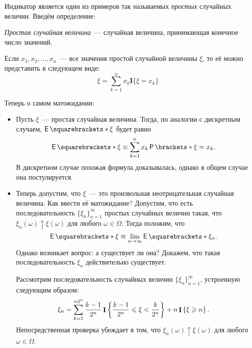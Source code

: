 Индикатор является один из примеров так называемых \emph{простых} случайных величин. Введём определение:

\begin{definition}
    \emph{Простая случайная величина}~--- случайная величина, принимающая конечное число значений.
\end{definition}

Если \(x_1, x_2, \dots, x_n\)~--- все значения простой случайной величины \(\xi\), то её можно представить в следующем виде:
\[
\xi = \sum_{k = 1}^{n} x_k\mathbf{I}\{\xi = x_k\}
\]

Теперь о самом матожидании:

\begin{itemize}
	\item Пусть \(\xi\)~--- простая случайная величина. Тогда, по аналогии с дискретным случаем, \(\E{\xi}\) будет равно
	\[
	\E{\xi} \equiv \sum_{k = 1}^{n} x_k\Pr{\xi = x_k}.
	\]
	В дискретном случае похожая формула доказывалась, однако в общем случае она постулируется.
	
	\item Теперь допустим, что \(\xi\)~--- это произвольная неотрицательная случайная величина. Как ввести её матожидание? Допустим, что есть последовательность \(\{\xi_n\}_{n = 1}^{\infty}\) простых случайных величин такая, что \(\xi_n(\omega) \uparrow \xi(\omega)\) для любого \(\omega \in \Omega\). Тогда положим, что
	\[
	\E{\xi} \equiv \lim\limits_{n \to \infty} \E{\xi_n}.
	\]
	Однако возникает вопрос: а существует ли она? Докажем, что такая последовательность \(\xi_n\) действительно существует.
	
	Рассмотрим последовательность случайных величин \(\{\xi_n\}_{n = 1}^{\infty}\), устроенную следующим образом:
	\[
	\xi_n = \sum_{k = 1}^{n2^n} \frac{k - 1}{2^n}\mathop{\mathbf{I}}\left\{\frac{k - 1}{2^n} \leqslant \xi < \frac{k}{2^n}\right\} + n\mathop{\mathbf{I}}\left\{\xi \geqslant n\right\}.
	\]
	Непосредственная проверка убеждает в том, что \(\xi_n(\omega) \uparrow \xi(\omega)\) для любого \(\omega \in \Omega\).
\end{itemize}
